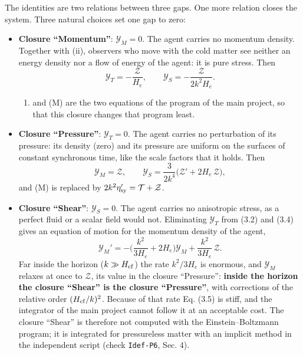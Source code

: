 \documentclass[
  10pt,
]{article}
\providecommand{\tightlist}{%
  \setlength{\itemsep}{0pt}\setlength{\parskip}{0pt}}
\begin{document}
The identities are two relations between three gaps. One more relation
closes the system. Three natural choices set one gap to zero:

\begin{itemize}
\tightlist
\item
  \textbf{Closure ``Momentum''}: \(\mathcal Y_M=0\). The agent carries
  no momentum density. Together with (ii), observers who move with the
  cold matter see neither an energy density nor a flow of energy of the
  agent: it is pure stress. Then
  \[\mathcal Y_T=-\frac{\mathcal Z}{H_e},\qquad \mathcal Y_S=-\frac{\mathcal Z}{2k^2H_e}.\]

  \begin{enumerate}
  \def\labelenumi{(\Alph{enumi})}
  \setcounter{enumi}{4}
  \tightlist
  \item
    and (M) are the two equations of the program of the main project, so
    that this closure changes that program least.
  \end{enumerate}
\item
  \textbf{Closure ``Pressure''}: \(\mathcal Y_T=0\). The agent carries
  no perturbation of its pressure: its density (zero) and its pressure
  are uniform on the surfaces of constant synchronous time, like the
  scale factors that it holds. Then
  \[\mathcal Y_M=\mathcal Z,\qquad \mathcal Y_S=\frac{3}{2k^4}\big(\mathcal Z'+2H_e\,\mathcal Z\big),\]
  and (M) is replaced by \(2k^2\eta_{\rm sy}'=\mathcal T+\mathcal Z\).
\item
  \textbf{Closure ``Shear''}: \(\mathcal Y_S=0\). The agent carries no
  anisotropic stress, as a perfect fluid or a scalar field would not.
  Eliminating \(\mathcal Y_T\) from (3.2) and (3.4) gives an equation of
  motion for the momentum density of the agent,
  \[\mathcal Y_M'=-\Big(\frac{k^2}{3H_e}+2H_e\Big)\mathcal Y_M+\frac{k^2}{3H_e}\,\mathcal Z .\tag{3.5}\]
  Far inside the horizon (\(k\gg H_{\rm cf}\)) the rate \(k^2/3H_e\) is
  enormous, and \(\mathcal Y_M\) relaxes at once to \(\mathcal Z\), its
  value in the closure ``Pressure'': \textbf{inside the horizon the
  closure ``Shear'' is the closure ``Pressure''}, with corrections of
  the relative order \((H_{\rm cf}/k)^2\). Because of that rate Eq.
  (3.5) is stiff, and the integrator of the main project cannot follow
  it at an acceptable cost. The closure ``Shear'' is therefore not
  computed with the Einstein--Boltzmann program; it is integrated for
  pressureless matter with an implicit method in the independent script
  (check \texttt{Idef-P6}, Sec. 4).
\end{itemize}
\end{document}
